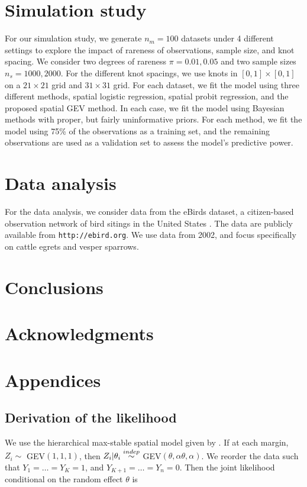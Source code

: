 \documentclass[11pt]{article}
\begin{document}
\section{Simulation study}\label{s:sim}
For our simulation study, we generate $n_m = 100$ datasets under 4 different settings to explore the impact of rareness of observations, sample size, and knot spacing.
We consider two degrees of rareness $\pi = 0.01, 0.05$ and two sample sizes $n_s = 1000, 2000$.
For the different knot spacings, we use knots in $[0, 1] \times [0, 1]$ on a $21 \times 21$ grid and $31 \times 31$ grid.
For each dataset, we fit the model using three different methods, spatial logistic regression, spatial probit regression, and the proposed spatial GEV method.
In each case, we fit the model using Bayesian methods with proper, but fairly uninformative priors.
For each method, we fit the model using 75\% of the observations as a training set, and the remaining observations are used as a validation set to assess the model's predictive power.

\section{Data analysis}\label{s:analysis}
For the data analysis, we consider data from the eBirds dataset, a citizen-based observation network of bird sitings in the United States \citep{Sullivan2009}.
The data are publicly available from {\tt http://ebird.org}.
We use data from 2002, and focus specifically on cattle egrets and vesper sparrows.

\section{Conclusions}\label{s:con}

\section*{Acknowledgments}

\appendix
\section{Appendices}

\subsection{Derivation of the likelihood} \label{a:likelihoodderivation}
We use the hierarchical max-stable spatial model given by \citet{Reich2012}. If at each margin, $Z_i \sim $ GEV$(1,1,1)$, then $Z_i | \theta_i \stackrel{indep}{\sim} $ GEV$(\theta, \alpha \theta, \alpha)$. We reorder the data such that $Y_1=\ldots=Y_K=1$, and $Y_{K+1} = \ldots = Y_n = 0$. Then the joint likelihood conditional on the random effect $\theta$ is
\end{document}
